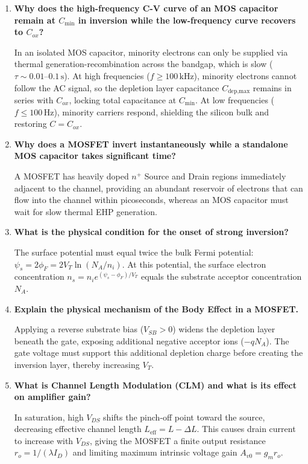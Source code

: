 \documentclass[12pt,a4paper]{article}
\newcommand{\Q}[1]{\textbf{#1}\par\noindent\ignorespaces}
\begin{document}
\begin{tcolorbox}[exambox, title={\textbf{Frequently Asked / Viva Questions}}]
\begin{enumerate}[topsep=0pt, label=\textbf{Q\arabic*.}, itemsep=5pt]
  \item \Q{Why does the high-frequency C-V curve of an MOS capacitor remain at $C_{\text{min}}$ in inversion while the low-frequency curve recovers to $C_{ox}$?}
    In an isolated MOS capacitor, minority electrons can only be supplied via thermal generation-recombination across the bandgap, which is slow ($\tau \sim 0.01\text{--}0.1\,\text{s}$). At high frequencies ($f \ge 100\,\text{kHz}$), minority electrons cannot follow the AC signal, so the depletion layer capacitance $C_{\text{dep,max}}$ remains in series with $C_{ox}$, locking total capacitance at $C_{\text{min}}$. At low frequencies ($f \le 100\,\text{Hz}$), minority carriers respond, shielding the silicon bulk and restoring $C = C_{ox}$.
  \item \Q{Why does a MOSFET invert instantaneously while a standalone MOS capacitor takes significant time?}
    A MOSFET has heavily doped $n^+$ Source and Drain regions immediately adjacent to the channel, providing an abundant reservoir of electrons that can flow into the channel within picoseconds, whereas an MOS capacitor must wait for slow thermal EHP generation.
  \item \Q{What is the physical condition for the onset of strong inversion?}
    The surface potential must equal twice the bulk Fermi potential: $\psi_s = 2\phi_F = 2 V_T \ln(N_A / n_i)$. At this potential, the surface electron concentration $n_s = n_i e^{(\psi_s - \phi_F)/V_T}$ equals the substrate acceptor concentration $N_A$.
  \item \Q{Explain the physical mechanism of the Body Effect in a MOSFET.}
    Applying a reverse substrate bias ($V_{SB} > 0$) widens the depletion layer beneath the gate, exposing additional negative acceptor ions ($-q N_A$). The gate voltage must support this additional depletion charge before creating the inversion layer, thereby increasing $V_T$.
  \item \Q{What is Channel Length Modulation (CLM) and what is its effect on amplifier gain?}
    In saturation, high $V_{DS}$ shifts the pinch-off point toward the source, decreasing effective channel length $L_{\text{eff}} = L - \Delta L$. This causes drain current to increase with $V_{DS}$, giving the MOSFET a finite output resistance $r_o = 1/(\lambda I_D)$ and limiting maximum intrinsic voltage gain $A_{v0} = g_m r_o$.

\end{enumerate}
\end{tcolorbox}
\end{document}
